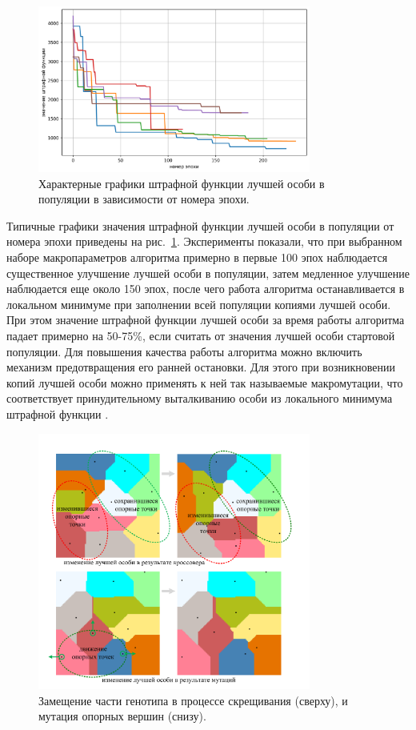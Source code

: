 \begin{figure}[ht]
\centering
\includegraphics[width=0.8\textwidth]{fig/par_gen_chart1.png}
\singlespacing
{}\caption{Характерные графики штрафной функции лучшей особи в популяции в зависимости от номера эпохи.}
\label{fig:text_2_genetic_chart1}
\end{figure}

Типичные графики значения штрафной функции лучшей особи в популяции от номера эпохи приведены на рис.~\ref{fig:text_2_genetic_chart1}.
Эксперименты показали, что при выбранном наборе макропараметров алгоритма примерно в первые 100 эпох наблюдается существенное улучшение лучшей особи в популяции, затем медленное улучшение наблюдается еще около 150 эпох, после чего работа алгоритма останавливается в локальном минимуме при заполнении всей популяции копиями лучшей особи.
При этом значение штрафной функции лучшей особи за время работы алгоритма падает примерно на 50-75\%, если считать от значения лучшей особи стартовой популяции.
Для повышения качества работы алгоритма можно включить механизм предотвращения его ранней остановки.
Для этого при возникновении копий лучшей особи можно применять к ней так называемые макромутации, что соответствует принудительному выталкиванию особи из локального минимума штрафной функции \cite{Baranov2025Gen}.

\begin{figure}[ht]
\centering
\includegraphics[width=0.8\textwidth]{fig/par_gen_changes.pdf}
\singlespacing
{}\caption{Замещение части генотипа в процессе скрещивания (сверху), и мутация опорных вершин (снизу).}
\label{fig:text_2_genetic_changes}
\end{figure}

